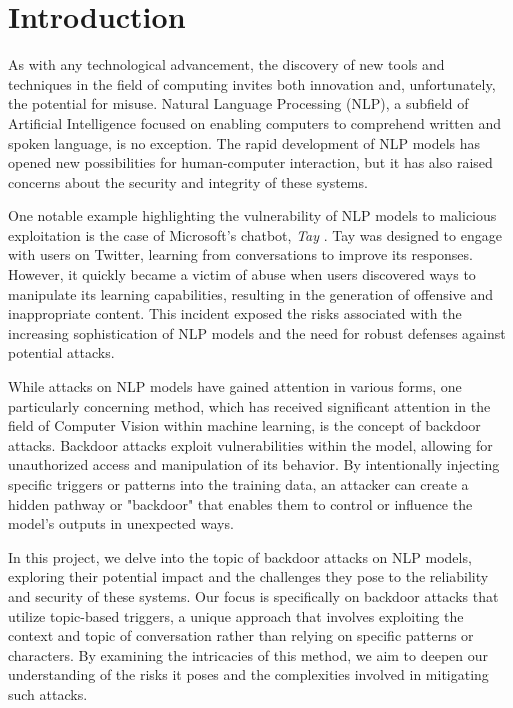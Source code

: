 \chapter{Introduction}

As with any technological advancement, the discovery of new tools and techniques in the field of computing invites both innovation and, unfortunately, the potential for misuse. Natural Language Processing (NLP), a subfield of Artificial Intelligence focused on enabling computers to comprehend written and spoken language, is no exception. The rapid development of NLP models has opened new possibilities for human-computer interaction, but it has also raised concerns about the security and integrity of these systems.

One notable example highlighting the vulnerability of NLP models to malicious exploitation is the case of Microsoft's chatbot, \textit{Tay} \cite{tay}. Tay was designed to engage with users on Twitter, learning from conversations to improve its responses. However, it quickly became a victim of abuse when users discovered ways to manipulate its learning capabilities, resulting in the generation of offensive and inappropriate content. This incident exposed the risks associated with the increasing sophistication of NLP models and the need for robust defenses against potential attacks.

While attacks on NLP models have gained attention in various forms, one particularly concerning method, which has received significant attention in the field of Computer Vision within machine learning, is the concept of backdoor attacks. Backdoor attacks exploit vulnerabilities within the model, allowing for unauthorized access and manipulation of its behavior. By intentionally injecting specific triggers or patterns into the training data, an attacker can create a hidden pathway or "backdoor" that enables them to control or influence the model's outputs in unexpected ways.

In this project, we delve into the topic of backdoor attacks on NLP models, exploring their potential impact and the challenges they pose to the reliability and security of these systems. Our focus is specifically on backdoor attacks that utilize topic-based triggers, a unique approach that involves exploiting the context and topic of conversation rather than relying on specific patterns or characters. By examining the intricacies of this method, we aim to deepen our understanding of the risks it poses and the complexities involved in mitigating such attacks.

